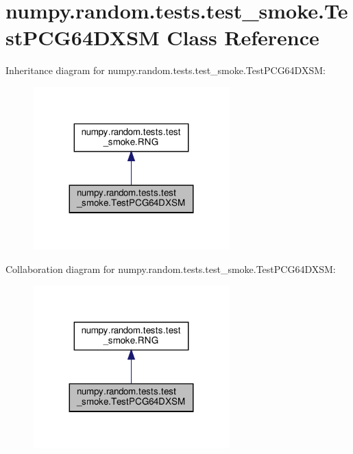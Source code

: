 \hypertarget{classnumpy_1_1random_1_1tests_1_1test__smoke_1_1TestPCG64DXSM}{}\section{numpy.\+random.\+tests.\+test\+\_\+smoke.\+Test\+P\+C\+G64\+D\+X\+SM Class Reference}
\label{classnumpy_1_1random_1_1tests_1_1test__smoke_1_1TestPCG64DXSM}


Inheritance diagram for numpy.\+random.\+tests.\+test\+\_\+smoke.\+Test\+P\+C\+G64\+D\+X\+SM\+:
\nopagebreak
\begin{figure}[H]
\begin{center}
\leavevmode
\includegraphics[width=215pt]{classnumpy_1_1random_1_1tests_1_1test__smoke_1_1TestPCG64DXSM__inherit__graph}
\end{center}
\end{figure}


Collaboration diagram for numpy.\+random.\+tests.\+test\+\_\+smoke.\+Test\+P\+C\+G64\+D\+X\+SM\+:
\nopagebreak
\begin{figure}[H]
\begin{center}
\leavevmode
\includegraphics[width=215pt]{classnumpy_1_1random_1_1tests_1_1test__smoke_1_1TestPCG64DXSM__coll__graph}
\end{center}
\end{figure}
